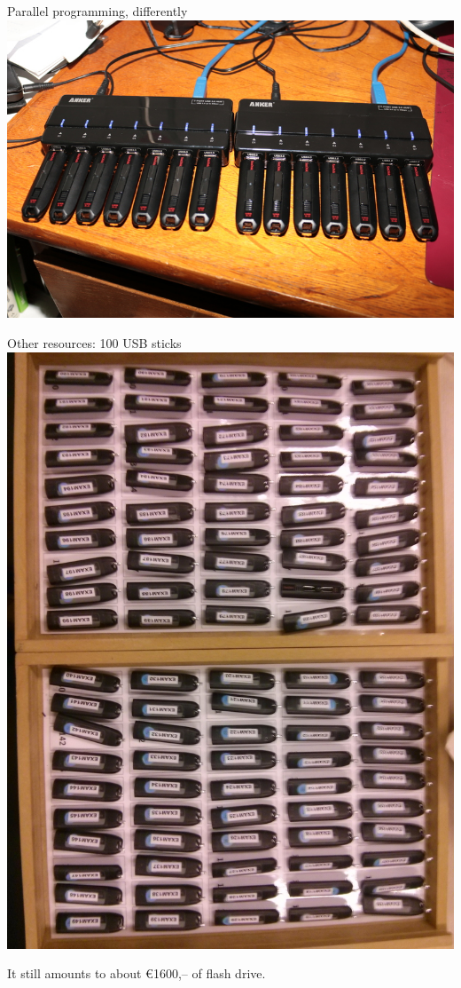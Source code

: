 \begin{frame}{Parallel programming, differently}
\includegraphics[width=\textwidth]{figures/14usbsticks.jpg}

\end{frame}

\begin{frame}{Other resources: 100 USB sticks}
\includegraphics[angle=90,width=\textwidth]{figures/boxesofsticks.jpg}

It still amounts to about \euro 1600,-- of flash drive.
\end{frame}
